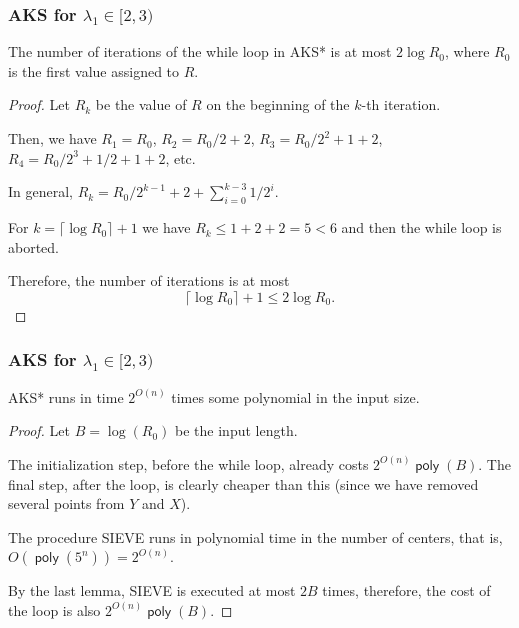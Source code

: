 \documentclass[aspectratio=43]{beamer}
\DeclareMathOperator{\poly}{\textsf{poly}}
\theoremstyle{remark}
\begin{document}
\begin{frame}
\frametitle{AKS for $\lambda_1 \in [2, 3)$}

\begin{lemma}
The number of iterations of the while loop in {\sc AKS*} is at most $2\log 
R_0$, where $R_0$ is the first value assigned to $R$.
\end{lemma}

\pause
\begin{proof}
Let $R_k$ be the value of $R$ on the beginning of the $k$-th iteration.

Then, we have $R_1 = R_0$, $R_2 = R_0/2 + 2$, $R_3 = R_0/2^2 + 1 + 2$, $R_4 = 
R_0/2^3 + 1/2 + 1 + 2$, etc.

In general, $R_k = R_0 / 2^{k-1} + 2 + \sum_{i=0}^{k-3}1/2^i$.

For $k = \lceil \log R_0 \rceil + 1$ we have $R_k \le 1 + 2 + 2 = 5 < 6$ and 
then the while loop is aborted.

Therefore, the number of iterations is at most 
$$\lceil \log R_0 \rceil + 1 \le 2\log R_0.$$
\end{proof}

\end{frame}


\begin{frame}
\frametitle{AKS for $\lambda_1 \in [2, 3)$}

\begin{lemma}
{\sc AKS*} runs in time $2^{O(n)}$ times some polynomial in the
input size.
\end{lemma}

\pause
\begin{proof}
	
	Let $B = \log(R_0)$ be the input length.
	\vspace*{0.1cm}
	
	The initialization step, before the while loop, already costs 
	$2^{O(n)}\poly(B)$. The final step, after the loop, is clearly cheaper than 
	this (since we have removed several points from $Y$ and $X$).
	\vspace*{0.1cm}	
	
	The procedure {\sc SIEVE} runs in polynomial time in the number of centers, 
	that is, $O(\poly(5^n)) = 2^{O(n)}$.
	\vspace*{0.1cm}
	
	By the last lemma, {\sc SIEVE} is executed at most $2B$ times,
	therefore, the cost of the loop is also $2^{O(n)}\poly(B)$.
\end{proof}

\end{frame}
\end{document}
